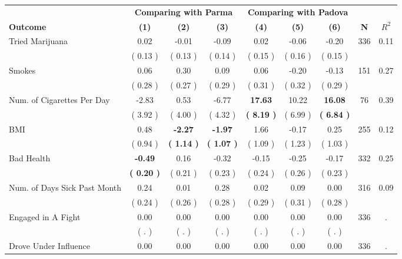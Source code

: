 \begin{tabular}{lcccccccc}
\toprule
 & \multicolumn{3}{c}{\textbf{Comparing with Parma}} & \multicolumn{3}{c}{\textbf{Comparing with Padova}} & \\
\cmidrule(lr){2-4} \cmidrule(lr){5-7} 
 \textbf{Outcome} & \textbf{(1)} & \textbf{(2)} & \textbf{(3)} & \textbf{(4)} & \textbf{(5)} & \textbf{(6)} & \textbf{N} & \textbf{$ R^2$} \\
\midrule
Tried Marijuana &      0.02 &     -0.01 &     -0.09 &      0.02 &     -0.06 &     -0.20 & 336 &       0.11 \\ 
 & (     0.13 ) & (     0.13 ) & (     0.14 ) & (     0.15 ) & (     0.16 ) & (     0.15 ) & \\
Smokes &      0.06 &      0.30 &      0.09 &      0.06 &     -0.20 &     -0.13 & 151 &       0.27 \\ 
 & (     0.28 ) & (     0.27 ) & (     0.29 ) & (     0.31 ) & (     0.32 ) & (     0.29 ) & \\
Num. of Cigarettes Per Day &     -2.83 &      0.53 &     -6.77 & \textbf{    17.63} &     10.22 & \textbf{    16.08} & 76 &       0.39 \\ 
 & (     3.92 ) & (     4.00 ) & (     4.32 ) & \textbf{(     8.19 )} & (     6.99 ) & \textbf{(     6.84 )} & \\
BMI &      0.48 & \textbf{    -2.27} & \textbf{    -1.97} &      1.66 &     -0.17 &      0.25 & 255 &       0.12 \\ 
 & (     0.94 ) & \textbf{(     1.14 )} & \textbf{(     1.07 )} & (     1.09 ) & (     1.23 ) & (     1.03 ) & \\
Bad Health & \textbf{    -0.49} &      0.16 &     -0.32 &     -0.15 &     -0.25 &     -0.17 & 332 &       0.25 \\ 
 & \textbf{(     0.20 )} & (     0.21 ) & (     0.23 ) & (     0.24 ) & (     0.26 ) & (     0.23 ) & \\
Num. of Days Sick Past Month &      0.24 &      0.01 &      0.28 &      0.02 &      0.09 &      0.00 & 316 &       0.09 \\ 
 & (     0.24 ) & (     0.26 ) & (     0.28 ) & (     0.29 ) & (     0.31 ) & (     0.28 ) & \\
Engaged in A Fight &      0.00 &      0.00 &      0.00 &      0.00 &      0.00 &      0.00 & 336 &          . \\ 
 & (        . ) & (        . ) & (        . ) & (        . ) & (        . ) & (        . ) & \\
Drove Under Influence &      0.00 &      0.00 &      0.00 &      0.00 &      0.00 &      0.00 & 336 &          . \\ 

\end{tabular}
